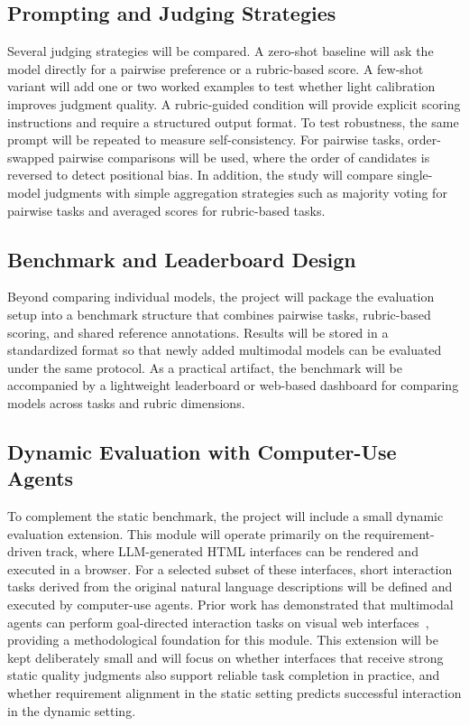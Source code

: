 \documentclass[pdflatex,sn-mathphys-num]{sn-jnl}
\begin{document}
\subsection{Prompting and Judging Strategies}

Several judging strategies will be compared. A zero-shot baseline will ask the model
directly for a pairwise preference or a rubric-based score. A few-shot variant will add
one or two worked examples to test whether light calibration improves judgment quality.
A rubric-guided condition will provide explicit scoring instructions and require a
structured output format. To test robustness, the same prompt will be repeated to
measure self-consistency. For pairwise tasks, order-swapped pairwise comparisons will
be used, where the order of candidates is reversed to detect positional bias. In
addition, the study will compare single-model judgments with simple aggregation
strategies such as majority voting for pairwise tasks and averaged scores for
rubric-based tasks.

\subsection{Benchmark and Leaderboard Design}

Beyond comparing individual models, the project will package the evaluation setup into
a benchmark structure that combines pairwise tasks, rubric-based scoring, and shared
reference annotations. Results will be stored in a standardized format so that newly
added multimodal models can be evaluated under the same protocol. As a practical
artifact, the benchmark will be accompanied by a lightweight leaderboard or web-based
dashboard for comparing models across tasks and rubric dimensions.

\subsection{Dynamic Evaluation with Computer-Use Agents}

To complement the static benchmark, the project will include a small dynamic evaluation
extension. This module will operate primarily on the requirement-driven track, where
LLM-generated HTML interfaces can be rendered and executed in a browser. For a selected
subset of these interfaces, short interaction tasks derived from the original natural
language descriptions will be defined and executed by computer-use agents. Prior work
has demonstrated that multimodal agents can perform goal-directed interaction tasks on
visual web interfaces~\cite{visualwebarena}, providing a methodological foundation for
this module. This extension will be kept deliberately small and will focus on whether
interfaces that receive strong static quality judgments also support reliable task
completion in practice, and whether requirement alignment in the static setting predicts
successful interaction in the dynamic setting.
\end{document}
